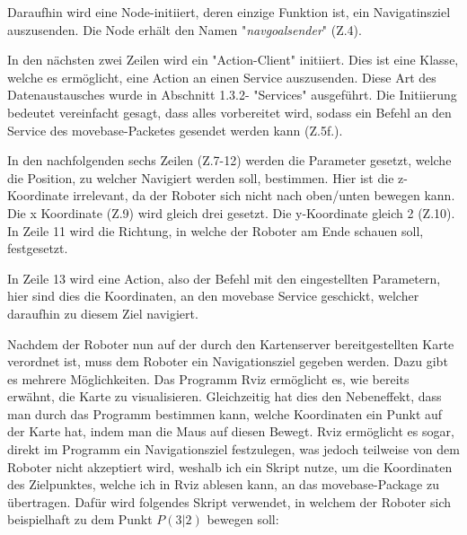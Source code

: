 {{{		 	Daraufhin wird eine Node-initiiert, deren einzige Funktion ist, ein Navigatinsziel auszusenden. Die Node erhält den Namen "\textit{nav\textunderscore goal\textunderscore sender}" (Z.4).
		 	
		 	In den nächsten zwei Zeilen wird ein "Action-Client" \space initiiert. Dies ist eine Klasse, welche es ermöglicht, eine Action an einen Service auszusenden. Diese Art des Datenaustausches wurde in Abschnitt 1.3.2- "Services" ausgeführt. Die Initiierung bedeutet vereinfacht gesagt, dass alles vorbereitet wird, sodass ein Befehl an den Service des move\textunderscore base-Packetes gesendet werden kann (Z.5f.).
		 	
		 	In den nachfolgenden sechs Zeilen (Z.7-12) werden die Parameter gesetzt, welche die Position, zu welcher Navigiert werden soll, bestimmen. Hier ist die z-Koordinate irrelevant, da der Roboter sich nicht nach oben/unten bewegen kann. Die x Koordinate (Z.9) wird gleich drei gesetzt. Die y-Koordinate gleich 2 (Z.10). In Zeile 11 wird die Richtung, in welche der Roboter am Ende schauen soll, festgesetzt.
		 	
		 	In Zeile 13 wird eine Action, also der Befehl mit den eingestellten Parametern, hier sind dies die Koordinaten, an den move\textunderscore base Service geschickt, welcher daraufhin zu diesem Ziel navigiert.
		 	
		 	
			
		}
	}
}

			Nachdem der Roboter nun auf der durch den Kartenserver bereitgestellten Karte verordnet ist, muss dem Roboter ein Navigationsziel gegeben werden.
Dazu gibt es mehrere Möglichkeiten. Das Programm Rviz ermöglicht es, wie bereits erwähnt, die Karte zu visualisieren. Gleichzeitig hat dies den Nebeneffekt, dass man durch das Programm bestimmen kann, welche Koordinaten ein Punkt auf der Karte hat, indem man die Maus auf diesen Bewegt. Rviz ermöglicht es sogar, direkt im Programm ein Navigationsziel festzulegen, was jedoch teilweise von dem Roboter nicht akzeptiert wird, weshalb ich ein Skript nutze, um die Koordinaten des Zielpunktes, welche ich in Rviz ablesen kann, an das move\textunderscore base-Package zu übertragen.
Dafür wird folgendes Skript verwendet, in welchem der Roboter sich beispielhaft zu dem Punkt $P(3|2)$ bewegen soll:
\newline  %

